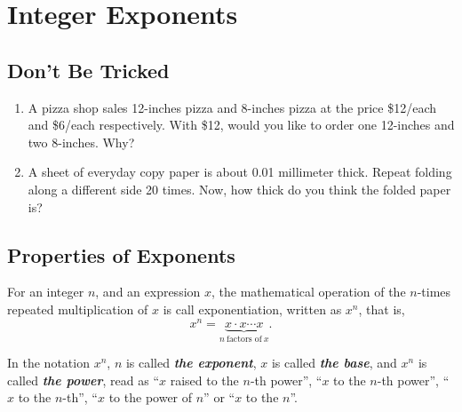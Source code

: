 \documentclass[
  en,11pt]{elegantbook}
\newcommand{\size}[2]{{\fontsize{#1}{0}\selectfont#2}}
\newenvironment{rmdthink}{
	\vspace*{0.5\baselineskip}
	\par\noindent
	\makebox[-4pt][r]{\color{green!90}\size{12}{\faLightbulbO}\,\,}
    \begin{tcolorbox}[
    enhanced,
    title={\textbf{\color{second}Think}},
    title style={left color=blue!10!green!20!white,right color=yellow!20!blue!20!white},
    colback=green!20!white,
    ]
    \sffamily
}{
    \end{tcolorbox}
	\par\ignorespacesafterend
}
\begin{document}
\hypertarget{integer-exponents}{%
\chapter{Integer Exponents}\label{integer-exponents}}

\hypertarget{dont-be-tricked}{%
\section{Don't Be Tricked}\label{dont-be-tricked}}

\begin{rmdthink}

\begin{enumerate}
\def\labelenumi{\arabic{enumi}.}
\item
  A pizza shop sales 12-inches pizza and 8-inches pizza at the price \$12/each and \$6/each respectively. With \$12, would you like to order one 12-inches and two 8-inches. Why?
\item
  A sheet of everyday copy paper is about 0.01 millimeter thick. Repeat folding along a different side 20 times. Now, how thick do you think the folded paper is?
\end{enumerate}

\end{rmdthink}

\hypertarget{properties-of-exponents}{%
\section{Properties of Exponents}\label{properties-of-exponents}}

For an integer \(n\), and an expression \(x\), the mathematical operation of the \(n\)-times repeated multiplication of \(x\) is call exponentiation, written as \(x^n\), that is,
\[
x^n=\underbrace{x\cdot x \cdots x}_{n~\text{factors of}~x}.
\]

In the notation \(x^n\), \(n\) is called \textbf{\emph{the exponent}}, \(x\) is called \textbf{\emph{the base}}, and \(x^n\) is called \textbf{\emph{the power}}, read as ``\(x\) raised to the \(n\)-th power'', ``\(x\) to the \(n\)-th power'', ``\(x\) to the \(n\)-th'', ``\(x\) to the power of \(n\)'' or ``\(x\) to the \(n\)''.
\end{document}
